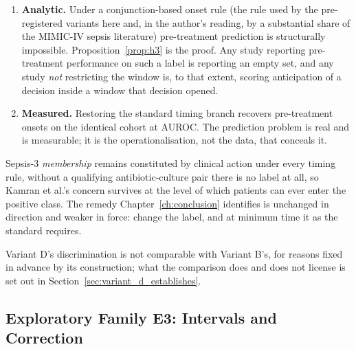 \begin{enumerate}
    \item \textbf{Analytic.} Under a conjunction-based onset rule (the rule
          used by the pre-registered variants here and, in the author's reading,
          by a substantial share of the MIMIC-IV sepsis literature)
          pre-treatment prediction is structurally impossible.
          Proposition~\ref{prop:h3} is the proof. Any study reporting
          pre-treatment performance on such a label is reporting an empty set,
          and any study \emph{not} restricting the window is, to that extent,
          scoring anticipation of a decision inside a window that decision
          opened.
    \item \textbf{Measured.} Restoring the standard timing branch recovers
          \pcPreTreatOnsetsVarF{} pre-treatment onsets on the identical cohort
          at \pcPreTreatAurocPrimaryF{} AUROC. The prediction problem is real
          and is measurable; it is the operationalisation, not the data, that
          conceals it.
\end{enumerate}

Sepsis-3 \emph{membership} remains constituted by clinical action under every
timing rule, without a qualifying antibiotic-culture pair there is no label
at all, so Kamran et al.'s \cite{kamran2024evaluation} concern survives at the
level of which patients can ever enter the positive class. The remedy
Chapter~\ref{ch:conclusion} identifies is unchanged in direction and weaker in
force: change the label, and at minimum time it as the standard requires.

Variant D's discrimination is not comparable with Variant B's, for reasons
fixed in advance by its construction; what the comparison does and does not
license is set out in Section~\ref{sec:variant_d_establishes}.

\subsection{Exploratory Family E3: Intervals and Correction}

